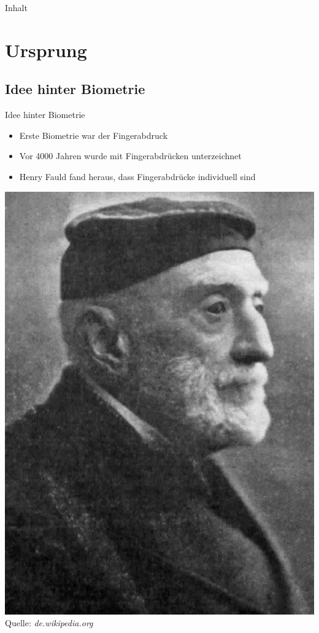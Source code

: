 \documentclass{beamer}
\begin{document}
\begin{frame}{Inhalt}
	\tableofcontents
\end{frame}

\section{Ursprung}
\subsection{Idee hinter Biometrie}
\begin{frame}{Idee hinter Biometrie}
	\begin{itemize}
		\item Erste Biometrie war der Fingerabdruck
		\item Vor 4000 Jahren wurde mit Fingerabdrücken unterzeichnet
		\item Henry Fauld fand heraus, dass Fingerabdrücke individuell sind \\[2ex]
	\end{itemize}
	\hspace{38mm}\includegraphics [height = 4 cm ]{Henry_Faulds.jpg} \\
	\hspace{40mm} \tiny{Quelle: \textit{\tiny{de.wikipedia.org}}}
\end{frame}
\end{document}
